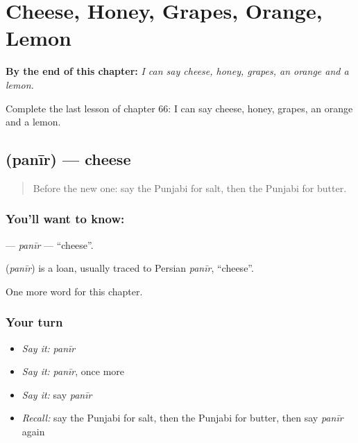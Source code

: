 
\chapter{Cheese, Honey, Grapes, Orange, Lemon}
\label{ch:pa-cheese-honey-grapes-orange-lemon}

\begin{chapteropening}
\textbf{By the end of this chapter:} \emph{I can say cheese, honey, grapes, an orange and a lemon.}

Complete the last lesson of chapter 66: I can say cheese, honey, grapes, an orange and a lemon.
\end{chapteropening}

\section[\texorpdfstring{\pa{ਪਨੀਰ} (panīr)}{ਪਨੀਰ (panīr)}]{ (panīr) — cheese}

\label{lesson:PA-C66-panir}



\begin{quote}
Before the new one: say the Punjabi for salt, then the Punjabi for butter.
\end{quote}

\subsection*{You'll want to know: }
\textbf{} — \emph{panīr} — \textquotedblleft{}cheese\textquotedblright{}.

\begin{cousinweb}
\textbf{} (\emph{panīr}) is a loan, usually traced to Persian \emph{panīr}, \textquotedblleft{}cheese\textquotedblright{}.
\end{cousinweb}

\begin{grammarlens}[title={What you've built}]
One more word for this chapter.
\end{grammarlens}

\subsection*{Your turn}
\begin{itemize}
\raggedright
  \item \emph{Say it:} \emph{panīr}
  \item \emph{Say it:} \emph{panīr}, once more
  \item \emph{Say it:} say \emph{panīr}
  \item \emph{Recall:} say the Punjabi for salt, then the Punjabi for butter, then say \emph{panīr} again
\end{itemize}

